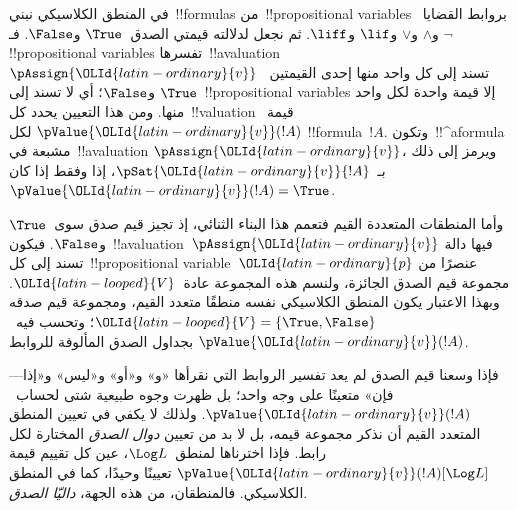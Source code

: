 \documentclass[../../../include/open-logic-section]{subfiles}
\begin{document}


في المنطق الكلاسيكي نبني~!!{formula}s من~!!{propositional variable}s
بروابط القضايا~$\lnot$ و$\land$ و$\lor$ و$\lif$ و$\liff$.
ثم نجعل لدلالته قيمتي الصدق~$\True$ و$\False$. فـ
  !!{propositional variable}s تفسرها~!!a{valuation}~$\pAssign{{\OLId{latin-ordinary}{v}}}$
  تسند إلى كل واحد منها إحدى القيمتين~$\True$ و$\False$؛ أي لا تسند
  إلى~!!{propositional variable}s إلا قيمة واحدة لكل واحد منها. ومن هذا
التعيين يحدد كل~!!{valuation} قيمة~$\pValue{{\OLId{latin-ordinary}{v}}}(!A)$ لكل
!!{formula}~$!A$. وتكون~!!^a{formula} مشبعة في~!!a{valuation}
$\pAssign{{\OLId{latin-ordinary}{v}}}$، ويرمز إلى ذلك بـ~$\pSat{{\OLId{latin-ordinary}{v}}}{!A}$، إذا وفقط إذا كان
$\pValue{{\OLId{latin-ordinary}{v}}}(!A) = \True$.

وأما المنطقات المتعددة القيم فتعمم هذا البناء الثنائي، إذ تجيز قيم
صدق سوى~$\True$ و$\False$. فيكون~!!a{valuation}~$\pAssign{{\OLId{latin-ordinary}{v}}}$ فيها
دالة تسند إلى كل~!!{propositional variable}~${\OLId{latin-ordinary}{p}}$ عنصرًا من مجموعة
قيم الصدق الجائزة، ولنسم هذه المجموعة عادة~${\OLId{latin-looped}{V}}$. وبهذا الاعتبار يكون
المنطق الكلاسيكي نفسه منطقًا متعدد القيم، ومجموعة قيم صدقه
${\OLId{latin-looped}{V}} = \{\True, \False\}$؛ وتحسب فيه~$\pValue{{\OLId{latin-ordinary}{v}}}(!A)$ بجداول الصدق
المألوفة للروابط.


فإذا وسعنا قيم الصدق لم يعد تفسير الروابط التي نقرأها «و» و«أو»
و«ليس» و«إذا---فإن» متعينًا على وجه واحد؛ بل ظهرت وجوه طبيعية شتى
لحساب~$\pValue{{\OLId{latin-ordinary}{v}}}(!A)$. ولذلك لا يكفي في تعيين المنطق المتعدد القيم
أن نذكر مجموعة قيمه، بل لا بد من تعيين \emph{دوال الصدق} المختارة
لكل رابط. فإذا اخترناها لمنطق~$\Log L$، عين كل تقييم قيمة
$\pValue{{\OLId{latin-ordinary}{v}}}(!A)[\Log L]$ تعيينًا وحيدًا، كما في المنطق الكلاسيكي.
فالمنطقان، من هذه الجهة، \emph{داليّا الصدق}.
\end{document}
